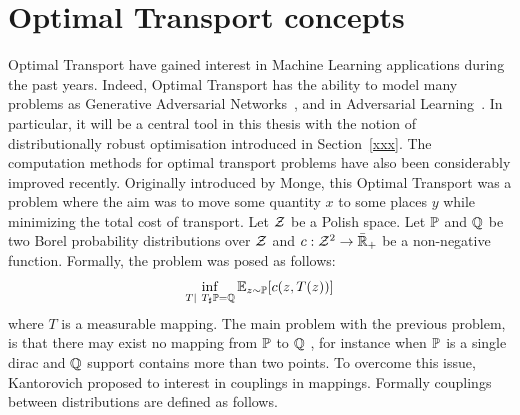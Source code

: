 

\section{Optimal Transport concepts}
Optimal Transport have gained interest in Machine Learning applications during the past years. Indeed, Optimal Transport has the ability to model many problems as Generative Adversarial Networks~\citep{arjovsky2017wasserstein}, and in Adversarial Learning~\citep{sinha2017certifying,pydi2019adversarial,bhagoji2019lower}. In particular, it will be a central tool in this thesis with the notion of distributionally robust optimisation introduced in Section~\ref{xxx}. The computation methods for optimal transport problems have also been considerably improved recently. Originally introduced by Monge, this Optimal Transport was a problem where the aim was to move some quantity $x$ to some places $y$ while minimizing the total cost of transport.  Let $\mathcal{Z}$ be a Polish space. Let $\mathbb{P}$ and $\mathbb{Q}$ be two Borel probability distributions over $\mathcal{Z}$ and $c:\mathcal{Z}^2\to\bar{\mathbb{R}}_+$ be a non-negative function. Formally, the problem was posed as follows:
\begin{align*}
    \inf_{T\mid~T_\sharp\PP = \QQ}\mathbb{E}_{z\sim\PP}\left[c(z,T(z))\right]
\end{align*}
where $T$ is a measurable mapping. The main problem with the previous problem, is that there may exist no mapping from $\mathbb{P}$ to $\mathbb{Q}$ , for instance when $\mathbb{P}$ is a single dirac and $\mathbb{Q}$ support contains more than two points. To overcome this issue, Kantorovich proposed to interest in couplings in mappings. Formally couplings between distributions are defined as follows.



